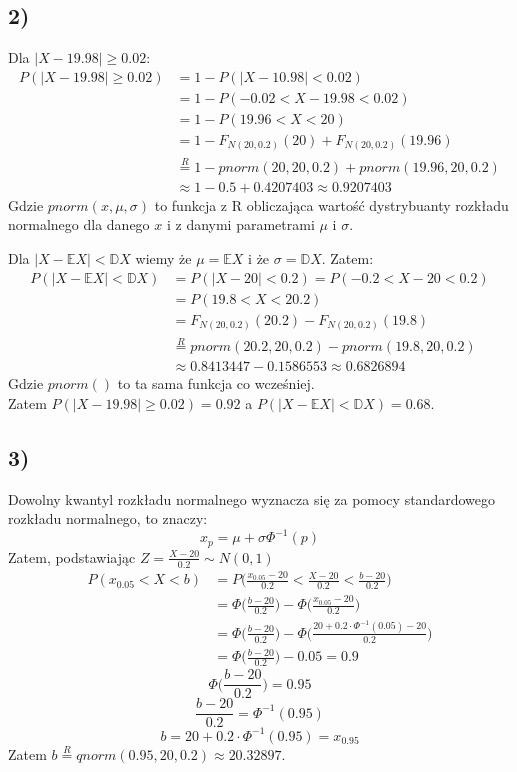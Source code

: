 \documentclass{article}
\begin{document}
{\subsection{2)}
Dla $|X-19.98|\geq 0.02$:
\begin{align*}
P(|X-19.98|\geq0.02) & = 1 - P(|X-10.98|<0.02) \\
& = 1 - P(-0.02<X-19.98<0.02) \\
& = 1 - P(19.96<X<20) \\
& = 1 - F_{N(20,0.2)}(20) + F_{N(20,0.2)}(19.96) \\
& \overset{R}{=} 1 - pnorm(20,20,0.2) + pnorm(19.96,20,0.2) \\
& \approx 1 - 0.5 + 0.4207403 \approx 0.9207403
\end{align*}
Gdzie $pnorm(x,\mu,\sigma)$ to funkcja z R obliczająca wartość dystrybuanty rozkładu normalnego dla danego $x$ i z danymi parametrami $\mu$ i $\sigma$.
\\
\par
Dla $|X-\mathbb{E}X|<\mathbb{D}X$ wiemy że $\mu = \mathbb{E}X$ i że $\sigma = \mathbb{D}X$. Zatem:
\begin{align*}
P(|X-\mathbb{E}X|<\mathbb{D}X) & = P(|X-20|<0.2) = P(-0.2<X-20<0.2) \\
& = P(19.8<X<20.2) \\
& = F_{N(20,0.2)}(20.2) - F_{N(20,0.2)}(19.8) \\
& \overset{R}{=} pnorm(20.2,20,0.2) - pnorm(19.8,20,0.2) \\
& \approx 0.8413447 - 0.1586553 \approx 0.6826894
\end{align*}
Gdzie $pnorm()$ to ta sama funkcja co wcześniej. \\
Zatem $P(|X-19.98|\geq0.02) = 0.92$ a $P(|X-\mathbb{E}X|<\mathbb{D}X) = 0.68$.

\subsection{3)}
Dowolny kwantyl rozkładu normalnego wyznacza się za pomocy standardowego rozkładu normalnego, to znaczy:
$$x_{p} = \mu + \sigma\Phi^{-1}(p)$$
Zatem, podstawiając $Z = \frac{X-20}{0.2} \sim N(0,1)$
\begin{align*}
P(x_{0.05}<X<b) & = P\Big(\frac{x_{0.05}-20}{0.2}<\frac{X-20}{0.2}<\frac{b-20}{0.2}\Big) \\
& =  \Phi\Big(\frac{b-20}{0.2}\Big) - \Phi\Big(\frac{x_{0.05}-20}{0.2}\Big) \\
& =  \Phi\Big(\frac{b-20}{0.2}\Big) - \Phi\Big(\frac{20+0.2\cdot\Phi^{-1}(0.05)-20}{0.2}\Big) \\
& =  \Phi\Big(\frac{b-20}{0.2}\Big) - 0.05 = 0.9
\end{align*}
$$ \Phi\Big(\frac{b-20}{0.2}\Big) = 0.95$$
$$\frac{b-20}{0.2} = \Phi^{-1}(0.95)$$
$$b = 20 + 0.2\cdot\Phi^{-1}(0.95) = x_{0.95}$$
Zatem $b \overset{R}{=} qnorm(0.95, 20, 0.2) \approx 20.32897$.

}
\end{document}

